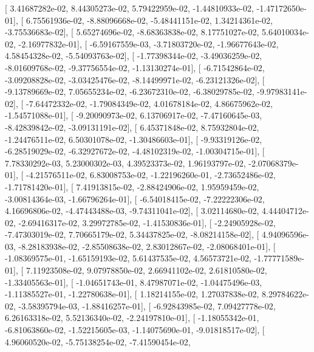 \documentclass{article}
\begin{document}
       [  3.41687282e-02,   8.44305273e-02,   5.79422959e-02,
         -1.44810933e-02,  -1.47172650e-01],
       [  6.75561936e-02,  -8.88096668e-02,  -5.48441151e-02,
          1.34214361e-02,  -3.75536683e-02],
       [  5.65274696e-02,  -8.68363838e-02,   8.17751027e-02,
          5.64010034e-02,  -2.16977832e-01],
       [ -6.59167559e-03,  -3.71803720e-02,  -1.96677643e-02,
          4.58454328e-02,  -5.54093763e-02],
       [ -1.77398344e-02,  -3.49036259e-02,  -8.01609768e-02,
         -9.37756554e-02,  -1.13130274e-01],
       [ -6.71542864e-02,  -3.09208828e-02,  -3.03425476e-02,
         -8.14499971e-02,  -6.23121326e-02],
       [ -9.13789669e-02,   7.05655234e-02,  -6.23672310e-02,
         -6.38029785e-02,  -9.97983141e-02],
       [ -7.64472332e-02,  -1.79084349e-02,   4.01678184e-02,
          4.86675962e-02,  -1.54571088e-01],
       [ -9.20090973e-02,   6.13706917e-02,  -7.47160645e-03,
         -8.42839842e-02,  -3.09131191e-02],
       [  6.45371848e-02,   8.75932804e-02,  -1.24476511e-02,
          6.50301078e-02,  -1.30486603e-01],
       [ -9.93319126e-02,  -6.28519029e-02,  -6.32927672e-02,
         -4.48102319e-02,  -1.00304715e-01],
       [  7.78330292e-03,   5.23000302e-03,   4.39523373e-02,
          1.96193797e-02,  -2.07068379e-01],
       [ -4.21576511e-02,   6.83008753e-02,  -1.22196260e-01,
         -2.73652486e-02,  -1.71781420e-01],
       [  7.41913815e-02,  -2.88424906e-02,   1.95959459e-02,
         -3.00814364e-03,  -1.66796264e-01],
       [ -6.54018415e-02,  -7.22222306e-02,   4.16696806e-02,
         -4.47443488e-03,  -9.74311041e-02],
       [  3.02114680e-02,   4.44404712e-02,  -2.69416317e-02,
          3.29972785e-02,  -1.41530836e-01],
       [ -2.24905928e-02,  -7.47303019e-02,   7.70665179e-02,
          5.34437825e-02,  -8.08214158e-02],
       [  4.94096596e-03,  -8.28183938e-02,  -2.85508638e-02,
          2.83012867e-02,  -2.08068401e-01],
       [ -1.08369575e-01,  -1.65159193e-02,   5.61437535e-02,
          4.56573721e-02,  -1.77771589e-01],
       [  7.11923508e-02,   9.07978850e-02,   2.66941102e-02,
          2.61810580e-02,  -1.33405563e-01],
       [ -1.04651743e-01,   8.47987071e-02,  -1.04475496e-03,
         -1.11385527e-01,  -1.22780638e-01],
       [  1.18214155e-02,   1.27037838e-02,   8.29784622e-02,
         -3.58395794e-03,  -1.88416257e-01],
       [ -6.92843985e-02,   7.09427778e-02,   6.26163318e-02,
          5.52136340e-02,  -2.24197810e-01],
       [ -1.18055342e-01,  -6.81063860e-02,  -1.52215605e-03,
         -1.14075690e-01,  -9.01818517e-02],
       [  4.96060520e-02,  -5.75138254e-02,  -7.41590454e-02,
\end{document}
